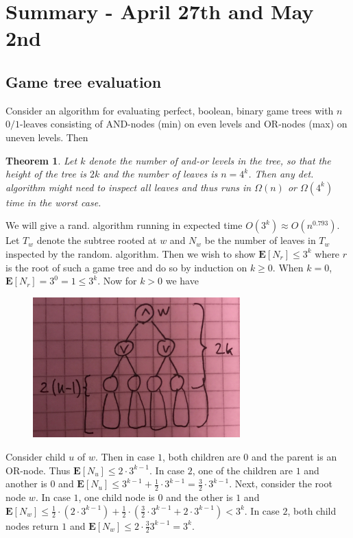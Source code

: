 \documentclass[12pt]{article}
\newtheorem{thm}{Theorem}[section]
\begin{document}
\pagebreak

\section*{Summary - April 27th and May 2nd}
\subsection*{Game tree evaluation}
Consider an algorithm for evaluating perfect, boolean, binary game trees with $n$ $0/1$-leaves consisting of AND-nodes (min) on even levels and OR-nodes (max) on uneven levels. Then
\\
\begin{thm}
Let $k$ denote the number of and-or levels in the tree, so that the height of the tree is $2k$ and the number of leaves is $n=4^k$. Then any det. algorithm might need to inspect all leaves and thus runs in $\Omega(n)$ or $\Omega(4^k)$ time in the worst case.
\end{thm}
We will give a rand. algorithm running in expected time $O(3^k) \approx O(n^{0.793})$. Let $T_w$ denote the subtree rooted at $w$ and $N_w$ be the number of leaves in $T_w$ inspected by the random. algorithm. Then we wish to show $\mathbf{E}\left[ N_r \right] \leq 3^k$ where $r$ is the root of such a game tree and do so by induction on $k \geq 0$. When $k=0$, $\mathbf{E}\left[ N_r \right] = 3^0 = 1 \leq 3^k$. Now for $k > 0$ we have
\begin{figure}[!ht]
\includegraphics[width=8cm]{img/gametree.png}
\centering
\end{figure}

Consider child $u$ of $w$. Then in case $1$, both children are $0$ and the parent is an OR-node. Thus $\mathbf{E}\left[ N_u \right] \leq 2 \cdot 3^{k-1}$. In case $2$, one of the children are $1$ and another is $0$ and $\mathbf{E}\left[ N_u \right] \leq 3^{k-1} + \frac{1}{2} \cdot 3^{k-1} = \frac{3}{2} \cdot 3^{k-1}$. Next, consider the root node $w$. In case $1$, one child node is $0$ and the other is $1$ and $\mathbf{E}\left[ N_w \right] \leq \frac{1}{2} \cdot \left( 2 \cdot 3^{k-1} \right) + \frac{1}{2} \cdot \left( \frac{3}{2} \cdot 3^{k-1} + 2 \cdot 3^{k-1} \right) < 3^k$. In case $2$, both child nodes return $1$ and $\mathbf{E}\left[ N_w \right] \leq 2 \cdot \frac{3}{2} 3^{k-1} = 3^{k}$.
\end{document}
